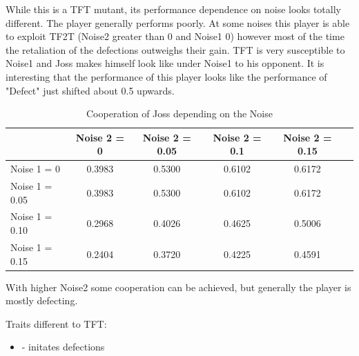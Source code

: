 \documentclass[11pt,twoside]{article}
\begin{document}
While this is a TFT mutant, its performance dependence on noise looks totally different. The player generally performs poorly. At some noises this player is able to exploit TF2T (Noise2 greater than 0 and Noise1 0) however most of the time the retaliation of the defections outweighs their gain. TFT is very susceptible to Noise1 and Joss makes himself look like under Noise1 to his opponent. It is interesting that the performance of this player looks like the performance of "Defect" just shifted about 0.5 upwards.

\begin{table}[h]
 \begin{center}
\caption{Cooperation of Joss depending on the Noise} \vspace{3mm}
\begin{tabular}{|l|c|c|c|c|c|}
\hline
   	& Noise 2 = 0 & Noise 2 = 0.05& Noise 2 = 0.1& Noise 2 = 0.15 \\
  \hline
  Noise 1 = 0 	&            0.3983  &  0.5300  &  0.6102  &  0.6172 \\
 \hline
  Noise 1 = 0.05	 &          0.3983 &   0.5300  &  0.6102 &  0.6172 \\
 \hline
  Noise 1 = 0.10 	&        0.2968  &  0.4026  &  0.4625    &0.5006 \\
 \hline
  Noise 1 = 0.15 	&     0.2404    &0.3720 &   0.4225  &  0.4591 \\
 \hline
\end{tabular}
 \end{center}
\end{table}

With higher Noise2 some cooperation can be achieved, but generally the player is mostly defecting.

Traits different to TFT:

\renewcommand{\labelitemi}{}
\begin{itemize}
	\item - initates defections
\end{itemize}
\renewcommand{\labelitemi}{$\bullet$}


\newpage
\end{document}
